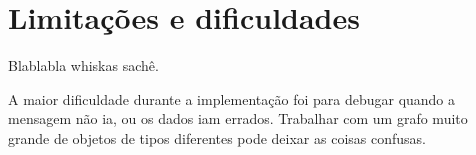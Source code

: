 \section{Limitações e dificuldades}

Blablabla whiskas sachê.

A maior dificuldade durante a implementação foi para debugar quando a
mensagem não ia, ou os dados iam errados. Trabalhar com um grafo muito
grande de objetos de tipos diferentes pode deixar as coisas confusas.


